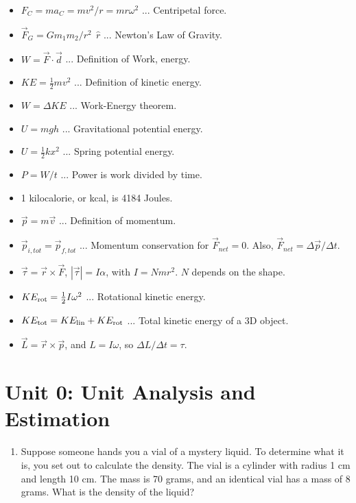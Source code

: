 \documentclass[10pt]{article}
\begin{document}
\begin{itemize}
\item $F_C = m a_C = mv^2/r = mr\omega^2$ ... Centripetal force.
\item $\vec{F}_G = G m_1 m_2/r^2 ~~ \hat{r}$ ... Newton's Law of Gravity.
\item $W = \vec{F} \cdot \vec{d}$ ... Definition of Work, energy.
\item $KE = \frac{1}{2}mv^2$ ... Definition of kinetic energy.
\item $W = \Delta KE$ ... Work-Energy theorem.
\item $U = mgh$ ... Gravitational potential energy.
\item $U = \frac{1}{2}kx^2$ ... Spring potential energy.
\item $P = W/t$ ... Power is work divided by time.
\item 1 kilocalorie, or kcal, is 4184 Joules.
\item $\vec{p} = m\vec{v}$ ... Definition of momentum.
\item $\vec{p}_{i,tot} = \vec{p}_{f,tot}$ ... Momentum conservation for $\vec{F}_{net} = 0$.  Also, $\vec{F}_{net} = \Delta \vec{p} / \Delta t$.
\item $\vec{\tau} = \vec{r}\times \vec{F}$, $|\vec{\tau}| = I \alpha$, with $I = N m r^2$.  $N$ depends on the shape.
\item $KE_{\rm rot} = \frac{1}{2} I \omega^2$ ... Rotational kinetic energy.
\item $KE_{\rm tot} = KE_{\rm lin} + KE_{\rm rot}$ ... Total kinetic energy of a 3D object.
\item $\vec{L} = \vec{r} \times \vec{p}$, and $L = I\omega$, so $\Delta L/\Delta t = \tau$.
\end{itemize}

\section{Unit 0: Unit Analysis and Estimation}

\begin{enumerate}
\item Suppose someone hands you a vial of a mystery liquid.  To determine what it is, you set out to calculate the density.  The vial is a cylinder with radius 1 cm and length 10 cm.  The mass is 70 grams, and an identical vial has a mass of 8 grams.  What is the density of the liquid? \\ \vspace{2cm}
\end{enumerate}
\end{document}
